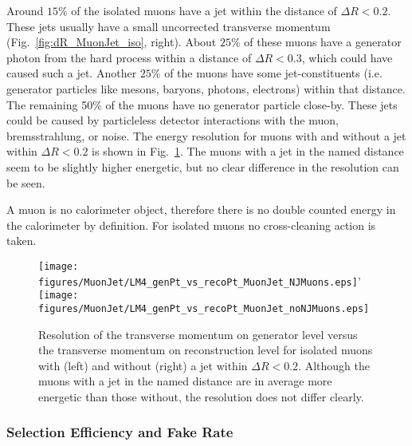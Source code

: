 \documentclass{cmspaper}
\begin{document}
Around \(15\%\) of the isolated muons have a jet within the distance of
\(\Delta R < 0.2\). These jets usually have a small uncorrected transverse
momentum (Fig.~\ref{fig:dR_MuonJet_iso}, right). About \(25\%\) of these muons
have a generator photon from the hard process within a distance of \(\Delta R <
0.3\), which could have caused such a jet. Another \(25\%\) of the muons have
some jet-constituents (i.e. generator particles like mesons, baryons,
photons, electrons) within that distance. 
The remaining 50\% of the muons have no generator particle
close-by. These jets could be caused by particleless detector interactions with
the muon, bremsstrahlung, or noise. 
The energy resolution for muons with and without a jet within
\(\Delta R < 0.2\) is shown in Fig.~\ref{fig:genPt_vs_recoPt_isoMuon}. The
muons with a jet in the named distance seem to be slightly higher energetic,
but no clear difference in the resolution can be seen. 

A muon is no calorimeter object, therefore there is no double counted
energy in the calorimeter by definition. For isolated muons no cross-cleaning
action is taken.
\begin{figure}[hb]
\begin{center}
    \texttt{[image: figures/MuonJet/LM4\_genPt\_vs\_recoPt\_MuonJet\_NJMuons.eps]}'
    \texttt{[image: figures/MuonJet/LM4\_genPt\_vs\_recoPt\_MuonJet\_noNJMuons.eps]}
    \caption{Resolution of the transverse momentum on generator level versus
the transverse momentum on reconstruction level for isolated muons with (left)
and without (right) a jet within \(\Delta R < 0.2\). Although the muons with a
jet in the named distance are in average more energetic than those without, the
resolution does not differ clearly.}
\label{fig:genPt_vs_recoPt_isoMuon}
\end{center}
\end{figure}

\subsubsection{Selection Efficiency and Fake Rate}
\end{document}
